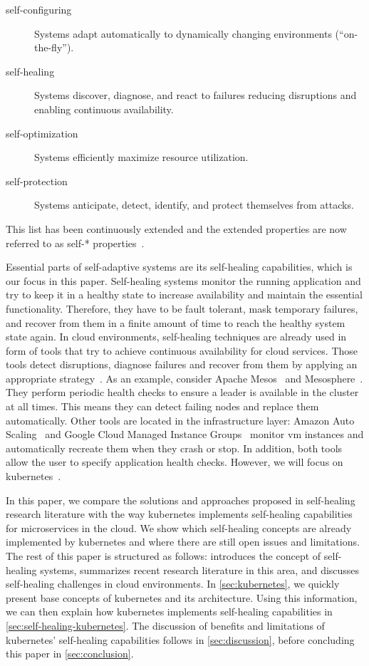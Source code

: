   \begin{description}
    \item[self-configuring] Systems adapt automatically to dynamically changing environments (\enquote{on-the-fly}).
    \item[self-healing] Systems discover, diagnose, and react to failures reducing disruptions and enabling continuous availability.
    \item[self-optimization] Systems efficiently maximize resource utilization.
    \item[self-protection] Systems anticipate, detect, identify, and protect themselves from attacks.
  \end{description}

  This list has been continuously extended and the extended properties are now referred to as self-* properties~\cite{PsaierSurvey}.

  Essential parts of self-adaptive systems are its self-healing capabilities, which is our focus in this paper.
  Self-healing systems monitor the running application and try to keep it in a healthy state to increase availability and maintain the essential functionality.
  Therefore, they have to be fault tolerant, mask temporary failures, and recover from them in a finite amount of time to reach the healthy system state again.
  In cloud environments, self-healing techniques are already used in form of tools that try to achieve continuous availability for cloud services.
  Those tools detect disruptions, diagnose failures and recover from them by applying an appropriate strategy~\cite{PsaierSurvey}.
  As an example, consider Apache Mesos~\cite{mesos} and Mesosphere~\cite{mesosphere}.
  They perform periodic health checks to ensure a leader is available in the cluster at all times.
  This means they can detect failing nodes and replace them automatically.
  Other tools are located in the infrastructure layer:
  Amazon Auto Scaling~\cite{amazon-auto-scaling} and Google Cloud Managed Instance Groups~\cite{gcp-mig} monitor \gls{vm} instances and automatically recreate them when they crash or stop.
  In addition, both tools allow the user to specify application health checks.
  However, we will focus on \gls{kubernetes}~\cite{kubernetes}.

  In this paper, we compare the solutions and approaches proposed in self-healing research literature with the way \gls{kubernetes} implements self-healing capabilities for microservices in the cloud.
  We show which self-healing concepts are already implemented by \gls{kubernetes} and where there are still open issues and limitations.
  The rest of this paper is structured as follows:
   introduces the concept of self-healing systems, summarizes recent research literature in this area, and discusses self-healing challenges in cloud environments.
  In \cref{sec:kubernetes}, we quickly present base concepts of \gls{kubernetes} and its architecture.
  Using this information, we can then explain how \gls{kubernetes} implements self-healing capabilities in \cref{sec:self-healing-kubernetes}.
  The discussion of benefits and limitations of \gls{kubernetes}' self-healing capabilities follows in \cref{sec:discussion}, before concluding this paper in \cref{sec:conclusion}.

